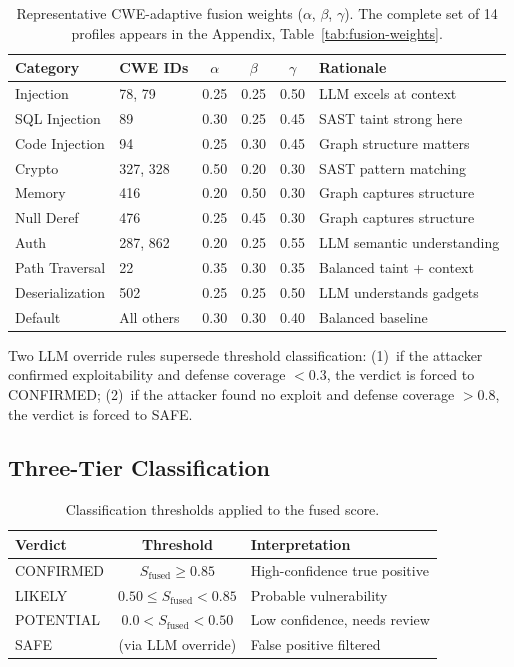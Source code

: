 \begin{table}[H]
\centering
\small
\caption{Representative CWE-adaptive fusion weights ($\alpha$, $\beta$, $\gamma$). The complete set of 14 profiles appears in the Appendix, Table~\ref{tab:fusion-weights}.}
\label{tab:cwe-weights}
\begin{tabular}{llcccp{4cm}}
\toprule
\textbf{Category} & \textbf{CWE IDs} & $\alpha$ & $\beta$ & $\gamma$ & \textbf{Rationale} \\
\midrule
Injection      & 78, 79        & 0.25 & 0.25 & 0.50 & LLM excels at context \\
SQL Injection  & 89            & 0.30 & 0.25 & 0.45 & SAST taint strong here \\
Code Injection & 94            & 0.25 & 0.30 & 0.45 & Graph structure matters \\
Crypto         & 327, 328      & 0.50 & 0.20 & 0.30 & SAST pattern matching \\
Memory         & 416           & 0.20 & 0.50 & 0.30 & Graph captures structure \\
Null Deref     & 476           & 0.25 & 0.45 & 0.30 & Graph captures structure \\
Auth           & 287, 862      & 0.20 & 0.25 & 0.55 & LLM semantic understanding \\
Path Traversal & 22            & 0.35 & 0.30 & 0.35 & Balanced taint + context \\
Deserialization & 502          & 0.25 & 0.25 & 0.50 & LLM understands gadgets \\
Default        & All others    & 0.30 & 0.30 & 0.40 & Balanced baseline \\
\bottomrule
\end{tabular}
\end{table}

Two LLM override rules supersede threshold classification: (1)~if the attacker confirmed exploitability and defense coverage $< 0.3$, the verdict is forced to CONFIRMED; (2)~if the attacker found no exploit and defense coverage $> 0.8$, the verdict is forced to SAFE.

\subsection{Three-Tier Classification}

\begin{table}[H]
\centering
\small
\caption{Classification thresholds applied to the fused score.}
\label{tab:classification}
\begin{tabular}{lcl}
\toprule
\textbf{Verdict} & \textbf{Threshold} & \textbf{Interpretation} \\
\midrule
CONFIRMED  & $S_{\text{fused}} \geq 0.85$ & High-confidence true positive \\
LIKELY     & $0.50 \leq S_{\text{fused}} < 0.85$ & Probable vulnerability \\
POTENTIAL  & $0.0 < S_{\text{fused}} < 0.50$ & Low confidence, needs review \\
SAFE       & (via LLM override) & False positive filtered \\
\bottomrule
\end{tabular}
\end{table}

